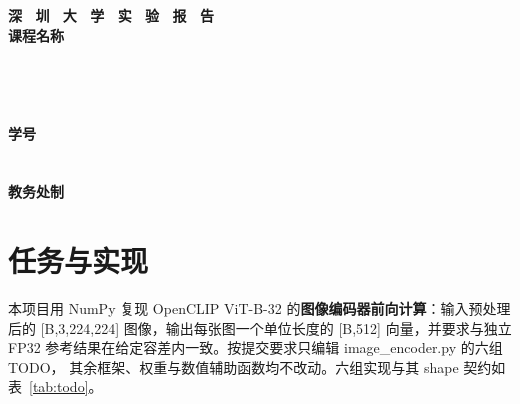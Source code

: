\documentclass[a4paper,12pt]{article}
\newcommand{\code}[1]{{\ttfamily\footnotesize #1}}
\begin{document}
\linespread{0.95}\selectfont   %

\begin{titlepage}
    \centering
    \vspace*{2cm}
    \Huge{\textbf{深 \ 圳 \ 大 \ 学 \ 实 \ 验 \ 报 \ 告}}\\[1.5cm]

    {\Large\textbf{课程名称}\quad\underline{}}\\[0.5cm]
{\Large
\noindent{}
\underline{}}\\[0.5cm]
{\Large
\noindent{}
\underline{}}\\[0.5cm]
{\Large
\noindent{}
\underline{}}\\[0.5cm]
{\Large
\noindent{}
\underline{}}\\[0.5cm]
{\Large
\noindent{}
\underline{}
\hspace{0.5cm}
\textbf{学号}
\underline{}}\\[0.5cm]
{\Large
\noindent{}
\underline{}}\\[0.5cm]
{\Large
\noindent{}
\underline{}}\\[1.5cm]

    \vfill
    \Large{\textbf{教务处制}}
\end{titlepage}

\newpage


\section{任务与实现}

本项目用 NumPy 复现 OpenCLIP ViT-B-32 的\textbf{图像编码器前向计算}：输入预处理后的
\code{[B,3,224,224]} 图像，输出每张图一个单位长度的 \code{[B,512]} 向量，并要求与独立
FP32 参考结果在给定容差内一致。按提交要求只编辑 \code{image\_encoder.py} 的六组 TODO，
其余框架、权重与数值辅助函数均不改动。六组实现与其 shape 契约如表~\ref{tab:todo}。
\end{document}
